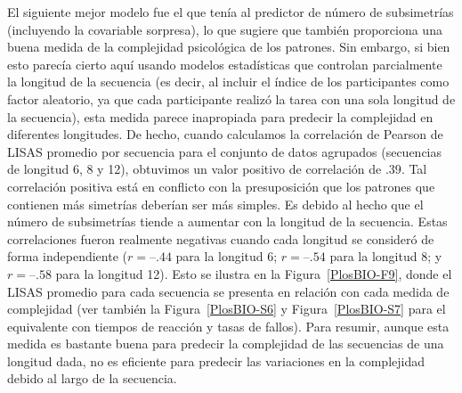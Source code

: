 El siguiente mejor modelo fue el que tenía al predictor de número de subsimetrías (incluyendo la covariable sorpresa), lo que sugiere que también proporciona una buena medida de la complejidad psicológica de los patrones. Sin embargo, si bien esto parecía cierto aquí usando modelos estadísticas que controlan parcialmente la longitud de la secuencia (es decir, al incluir el índice de los participantes como factor aleatorio, ya que cada participante realizó la tarea con una sola longitud de la secuencia), esta medida parece inapropiada para predecir la complejidad en diferentes longitudes. De hecho, cuando calculamos la correlación de Pearson de LISAS promedio por secuencia para el conjunto de datos agrupados (secuencias de longitud 6, 8 y 12), obtuvimos un valor positivo de correlación de $.39$. Tal correlación positiva está en conflicto con la presuposición que los patrones que contienen más simetrías deberían ser más simples. Es debido al hecho que el número de subsimetrías tiende a aumentar con la longitud de la secuencia. Estas correlaciones fueron realmente negativas cuando cada longitud se consideró de forma independiente ($r = –.44$ para la longitud 6; $r= –.54$ para la longitud 8; y $r = –.58$ para la longitud 12). Esto se ilustra en la Figura~\ref{PlosBIO-F9}, donde el LISAS promedio para cada secuencia se presenta en relación con cada medida de complejidad (ver también la Figura~\ref{PlosBIO-S6} y Figura~\ref{PlosBIO-S7} para el equivalente con tiempos de reacción y tasas de fallos). Para resumir, aunque esta medida es bastante buena para predecir la complejidad de las secuencias de una longitud dada, no es eficiente para predecir las variaciones en la complejidad debido al largo de la secuencia.


